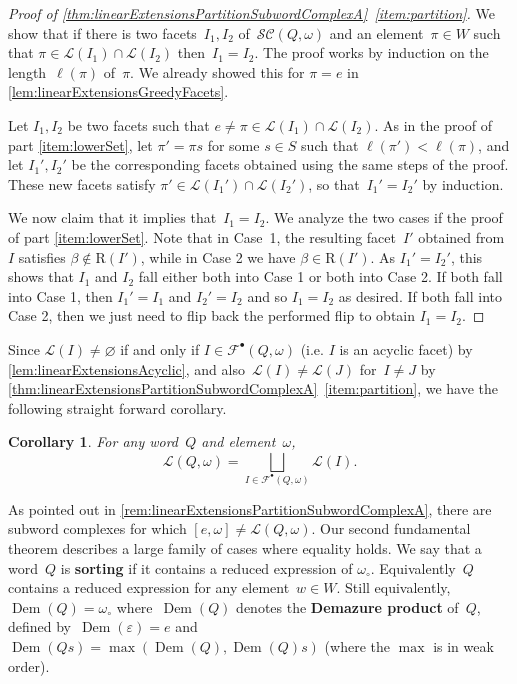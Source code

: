 \documentclass[reqno]{amsart}
\newtheorem{corollary}[theorem]{Corollary}
\theoremstyle{definition}
\DeclareMathOperator{\DemazureProduct}{Dem} %
\newcommand{\defn}[1]{\textbf{\textsf{\color{PineGreen} #1}}} %
\newcommand{\linearExtensions}{\mathcal{L}} %
\newcommand{\wo}{\omega_\circ} %
\newcommand{\subwordComplex}{\mathcal{SC}} %
\newcommand{\Roots}{\mathrm{R}} %
\newcommand{\subwordAcyclicFacets}{\mathcal{F}^\bullet} %
\begin{document}
\begin{proof}[Proof of \cref{thm:linearExtensionsPartitionSubwordComplexA}~\eqref{item:partition}]
We show that if there is two facets~$I_1, I_2$ of~$\subwordComplex(Q, \omega)$ and an element~$\pi \in W$ such that $\pi \in \linearExtensions(I_1) \cap \linearExtensions(I_2)$ then~$I_1= I_2$.
The proof works by induction on the length~$\ell(\pi)$ of~$\pi$.
We already showed this for $\pi = e$ in \cref{lem:linearExtensionsGreedyFacets}.

Let $I_1, I_2$ be two facets such that $e \neq \pi \in \linearExtensions(I_1)\cap \linearExtensions(I_2)$.
As in the proof of part \eqref{item:lowerSet}, let $\pi'=\pi s$ for some $s\in S$ such that $\ell(\pi')<\ell(\pi)$, and let $I_1',I_2'$ be the corresponding facets obtained using the same steps of the proof.
These new facets satisfy $\pi' \in \linearExtensions(I_1')\cap \linearExtensions(I_2')$, so that~$I_1' = I_2'$ by induction.

We now claim that it implies that~$I_1 = I_2$.
We analyze the two cases if the proof of part \eqref{item:lowerSet}.
Note that in Case~1, the resulting facet~$I'$ obtained from $I$ satisfies $\beta\notin \Roots(I')$, while in Case 2 we have $\beta \in \Roots(I')$. 
As $I_1' = I_2'$, this shows that $I_1$ and $I_2$ fall either both into Case 1 or both into Case 2.
If both fall into Case 1, then $I_1'=I_1$ and $I_2'=I_2$ and so $I_1=I_2$ as desired.
If both fall into Case 2, then we just need to flip back the performed flip to obtain $I_1=I_2$.
\end{proof}

Since $\linearExtensions(I)\neq \varnothing$ if and only if $I\in \subwordAcyclicFacets(Q,\omega)$ (i.e. $I$ is an acyclic facet) by \cref{lem:linearExtensionsAcyclic}, and also~$\linearExtensions(I) \ne \linearExtensions(J)$ for~$I \ne J$ by \cref{thm:linearExtensionsPartitionSubwordComplexA}~\eqref{item:partition}, we have the following straight forward corollary.

\begin{corollary}
\label{coro:linearExtensionsPartitionSubwordComplexes}
For any word~$Q$ and element~$\omega$,
\[
\linearExtensions(Q,\omega) = \bigsqcup_{I\in\subwordAcyclicFacets(Q,\omega)} \linearExtensions(I).
\]
\end{corollary}

As pointed out in \cref{rem:linearExtensionsPartitionSubwordComplexA}, there are subword complexes for which $[e,\omega] \neq \linearExtensions(Q,\omega)$.
Our second fundamental theorem describes a large family of cases where equality holds.
We say that a word~$Q$ is \defn{sorting} if it contains a reduced expression of $\wo$.
Equivalently~$Q$ contains a reduced expression for any element~$w \in W$.
Still equivalently, $\DemazureProduct(Q) = \wo$ where~$\DemazureProduct(Q)$ denotes the \defn{Demazure product} of~$Q$, defined by~$\DemazureProduct(\varepsilon) = e$ and~$\DemazureProduct(Qs) = \max(\DemazureProduct(Q), \DemazureProduct(Q)s)$ (where the $\max$ is in weak order).
\end{document}
